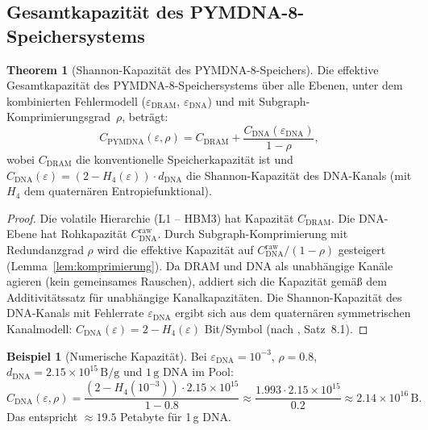 ﻿\documentclass[a4paper,12pt]{article}
\theoremstyle{definition}
\newtheorem{beispiel}{Beispiel}[section]
\newtheorem{theorem}{Theorem}[section]
\begin{document}
\subsection{Gesamtkapazität des PYMDNA-8-Speichersystems}

\begin{theorem}[Shannon-Kapazität des PYMDNA-8-Speichers]
  \label{thm:kapazitaet}
  Die effektive Gesamtkapazität des PYMDNA-8-Speichersystems über alle
  Ebenen, unter dem kombinierten Fehlermodell ($\varepsilon_{\mathrm{DRAM}}$,
  $\varepsilon_{\mathrm{DNA}}$) und mit Subgraph-Komprimierungsgrad~$\rho$, beträgt:
  \begin{equation}
    C_{\mathrm{PYMDNA}}(\varepsilon, \rho)
    = C_{\mathrm{DRAM}} + \frac{C_{\mathrm{DNA}}(\varepsilon_{\mathrm{DNA}})}{1 - \rho},
    \label{eq:kapazitaet}
  \end{equation}
  wobei $C_{\mathrm{DRAM}}$ die konventionelle Speicherkapazität ist und
  $C_{\mathrm{DNA}}(\varepsilon) = (2 - H_4(\varepsilon)) \cdot d_{\mathrm{DNA}}$
  die Shannon-Kapazität des DNA-Kanals (mit $H_4$ dem quaternären Entropiefunktional).
\end{theorem}

\begin{proof}
  Die volatile Hierarchie (L1 -- HBM3) hat Kapazität $C_{\mathrm{DRAM}}$.
  Die DNA-Ebene hat Rohkapazität $C_{\mathrm{DNA}}^{\mathrm{raw}}$.
  Durch Subgraph-Komprimierung mit Redundanzgrad $\rho$ wird die effektive
  Kapazität auf $C_{\mathrm{DNA}}^{\mathrm{raw}} / (1-\rho)$ gesteigert
  (Lemma~\ref{lem:komprimierung}).
  Da DRAM und DNA als unabhängige Kanäle agieren (kein gemeinsames Rauschen),
  addiert sich die Kapazität gemäß dem Additivitätssatz für unabhängige
  Kanalkapazitäten.
  Die Shannon-Kapazität des DNA-Kanals mit Fehlerrate $\varepsilon_{\mathrm{DNA}}$
  ergibt sich aus dem quaternären symmetrischen Kanalmodell:
  $C_{\mathrm{DNA}}(\varepsilon) = 2 - H_4(\varepsilon)$ Bit/Symbol
  (nach \cite{epp2026dnastor}, Satz~8.1).
\end{proof}

\begin{beispiel}[Numerische Kapazität]
  Bei $\varepsilon_{\mathrm{DNA}} = 10^{-3}$, $\rho = 0.8$,
  $d_{\mathrm{DNA}} = 2.15 \times 10^{15}\,\mathrm{B/g}$ und
  $1\,\mathrm{g}$ DNA im Pool:
  \[
    C_{\mathrm{DNA}}(\varepsilon, \rho)
    = \frac{(2 - H_4(10^{-3})) \cdot 2.15 \times 10^{15}}{1 - 0.8}
    \approx \frac{1.993 \cdot 2.15 \times 10^{15}}{0.2}
    \approx 2.14 \times 10^{16}\,\mathrm{B}.
  \]
  Das entspricht $\approx 19.5$ Petabyte für 1\,g DNA.
\end{beispiel}
\end{document}
